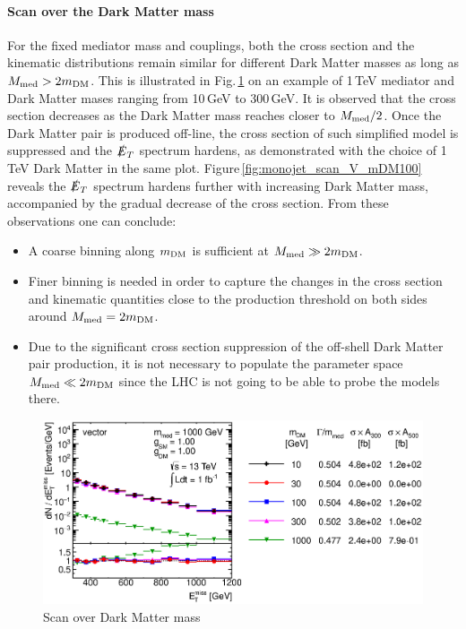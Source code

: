 \paragraph{Scan over the Dark Matter mass}

For the fixed mediator mass and couplings, both the cross section and the kinematic distributions remain similar for different Dark Matter masses as long as $M_{\rm{med}}>2m_{\rm{DM}}$. This is illustrated in Fig.\,\ref{fig:monojet_scan_V_mDM1000} on an example of 1\,TeV mediator and Dark Matter mases ranging from 10\,GeV to 300\,GeV. It is observed that the cross section decreases as the Dark Matter mass reaches closer to $M_{\rm{med}}/2$. Once the Dark Matter pair is produced off-line, the cross section of such simplified model is suppressed and the $\slashed{E}_T$ spectrum hardens, as demonstrated with the choice of 1\,TeV Dark Matter in the same plot. Figure\,\ref{fig:monojet_scan_V_mDM100} reveals the $\slashed{E}_T$ spectrum hardens further with increasing Dark Matter mass, accompanied by the gradual decrease of the cross section. From these observations one can conclude:
\begin{itemize}
\item A coarse binning along $m_{\rm{DM}}$ is sufficient at $M_{\rm{med}} \gg 2m_{\rm{DM}}$.
\item Finer binning is needed in order to capture the changes in the cross section and kinematic quantities close to the production threshold on both sides around $M_{\rm{med}}=2m_{\rm{DM}}$.
\item Due to the significant cross section suppression of the off-shell Dark Matter pair production, it is not necessary to populate the parameter space $M_{\rm{med}} \ll 2m_{\rm{DM}}$ since the LHC is not going to be able to probe the models there.
\end{itemize}

\begin{figure}
\centering
\includegraphics[width=0.9\linewidth]{figures/monojet/scan_mDM_V_1000.eps}
\caption{Scan over Dark Matter mass}
\label{fig:monojet_scan_V_mDM1000}
\end{figure}

